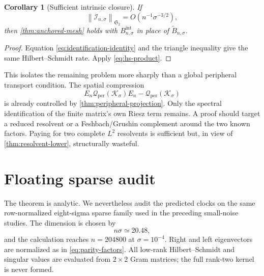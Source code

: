 \documentclass[11pt]{article}
\newtheorem{corollary}[theorem]{Corollary}
\theoremstyle{remark}
\newcommand{\cK}{\mathcal K}
\newcommand{\cQ}{\mathcal Q}
\newcommand{\cI}{\mathcal I}
\newcommand{\norm}[1]{\left\lVert#1\right\rVert}
\newcommand{\HS}{\mathfrak S_2}
\begin{document}
\begin{corollary}[Sufficient intrinsic closure]
\label{cor:intrinsic-closure}
If
\begin{equation}
 \norm{\cI_{n,\sigma}}_{\HS}
 =O(n^{-1}\sigma^{-3/2}),
 \label{eq:identification-target}
\end{equation}
then \cref{thm:anchored-mesh} holds with
$B_{n,\sigma}^{\mathrm{int}}$ in place of
$\widetilde B_{n,\sigma}$.
\end{corollary}

\begin{proof}
Equation \eqref{eq:identification-identity} and the triangle inequality give
the same Hilbert--Schmidt rate.  Apply \eqref{eq:hs-product}.
\end{proof}

This isolates the remaining problem more sharply than a global peripheral
transport condition.  The spatial compression
\[
 E_n\cQ_{\mathrm{per}}(\cK_\sigma)E_n
 -\cQ_{\mathrm{per}}(\cK_\sigma)
\]
is already controlled by \cref{thm:peripheral-projection}.  Only the spectral
identification of the finite matrix's own Riesz term remains.  A proof should
target a reduced resolvent or a Feshbach/Grushin complement around the two
known factors.  Paying for two complete $L^2$ resolvents is sufficient but,
in view of \cref{thm:resolvent-lower}, structurally wasteful.

\section{Floating sparse audit}
\label{sec:numerics}

The theorem is analytic.  We nevertheless audit the predicted clocks on the
same row-normalized eight-sigma sparse family used in the preceding
small-noise studies.  The dimension is chosen by
\begin{equation}
 n\sigma\simeq20.48,
 \label{eq:numerical-resolution}
\end{equation}
and the calculation reaches $n=204800$ at $\sigma=10^{-4}$.
Right and left eigenvectors are normalized as in
\eqref{eq:parity-factors}.  All low-rank Hilbert--Schmidt and singular values
are evaluated from $2\times2$ Gram matrices; the full rank-two kernel is
never formed.
\end{document}
